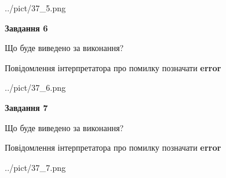 \documentclass[10pt, ukrainian]{article}
\begin{document}
{\begin {large}
\begin{center}
	{../pict/37_5.png}
\end{center}
\newpage

{\begin {center}\textbf{Завдання 6}\end {center}}\par
Що буде виведено за виконання? \par
Повідомлення інтерпретатора про помилку позначати \textbf{error}

\begin{center}
	{../pict/37_6.png}
\end{center}
\newpage

{\begin {center}\textbf{Завдання 7}\end {center}}\par
Що буде виведено за виконання? \par
Повідомлення інтерпретатора про помилку позначати \textbf{error}

\begin{center}
	{../pict/37_7.png}
\end{center}
\newpage

\end {large}}
\end{document}
